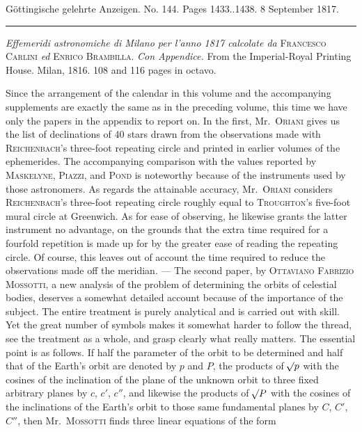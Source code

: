 \clearpage
{}
\hypertarget{native-606-lower}{}
\begin{center}\small Göttingische gelehrte Anzeigen. No. 144. Pages 1433..1438. 8 September 1817.\\[3pt]\rule{.72\linewidth}{.3pt}\end{center}

{\setlength{\rightskip}{0pt plus 3em}\emph{Effemeridi astronomiche di Milano per l'anno \textup{1817} calcolate da} \textsc{Francesco Carlini} \emph{ed} \textsc{Enrico Brambilla}. \emph{Con Appendice.} From the Imperial-Royal Printing House. Milan, 1816. 108 and 116 pages in octavo.\par}

\begingroup{}\relax
Since the arrangement of the calendar in this volume and the accompanying supplements are exactly the same as in the preceding volume, this time we have only the papers in the appendix to report on. In the first, Mr.\ \textsc{Oriani} gives us the list of declinations of 40 stars drawn from the observations made with \textsc{Reichenbach}’s three-foot repeating circle and printed in earlier volumes of the ephemerides. The accompanying comparison with the values reported by \textsc{Maskelyne}, \textsc{Piazzi}, and \textsc{Pond} is noteworthy because of the instruments used by those astronomers. As regards the attainable accuracy, Mr.\ \textsc{Oriani} considers \textsc{Reichenbach}’s three-foot repeating circle roughly equal to \textsc{Troughton}’s five-foot mural circle at Greenwich. As for ease of observing, he likewise grants the latter instrument no advantage, on the grounds that the extra time required for a fourfold repetition is made up for by the greater ease of reading the repeating circle. Of course, this leaves out of account the time required to reduce the observations made off the meridian. --- The second paper, by \textsc{Ottaviano Fabrizio Mossotti}, a new analysis of the problem of determining the orbits of celestial bodies, deserves a somewhat detailed account because of the importance of the subject. The entire treatment is purely analytical and is carried out with skill. Yet the great number of symbols makes it somewhat harder to follow the thread, see the treatment as a whole, and grasp clearly what really matters. The essential point is as follows. If half the parameter of the orbit to be determined and half that of the Earth’s orbit are denoted by $p$ and $P$, the products of $\mathord{{}^{}\!\surd}p$ with the cosines of the inclination of the plane of the unknown orbit to three fixed arbitrary planes by $c$, $c'$, $c''$, and likewise the products of $\mathord{{}^{}\!\surd}P$ with the cosines of the inclinations of the Earth’s orbit to those same fundamental planes by $C$, $C'$, $C''$, then Mr.\ \textsc{Mossotti} finds three linear equations of the form
